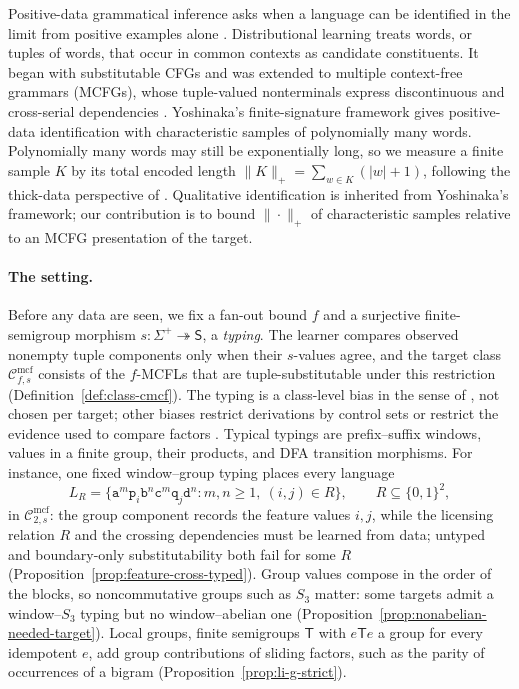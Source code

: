 \documentclass[11pt]{article}
\numberwithin{equation}{section}
\theoremstyle{plain}
\theoremstyle{definition}
\theoremstyle{remark}
\newcommand{\Cmcf}[2]{\mathcal{C}^{\mathrm{mcf}}_{#1,#2}}
\begin{document}
Positive-data grammatical inference asks when a language can be identified
in the limit from positive examples alone \cite{Gold1967,Angluin1980}.
Distributional learning treats words, or tuples of words, that occur in
common contexts as candidate constituents.  It began with substitutable
CFGs \cite{ClarkEyraud2007,Yoshinaka2008} and was extended to multiple
context-free grammars (MCFGs), whose tuple-valued nonterminals express
discontinuous and cross-serial dependencies
\cite{SekiEtAl1991,Yoshinaka2009,Yoshinaka2011,Kallmeyer2010}.
Yoshinaka's finite-signature framework \cite{Yoshinaka2015General} gives
positive-data identification with characteristic samples of polynomially
many words.  Polynomially many words may still be exponentially long, so we
measure a finite sample $K$ by its total encoded length
$\|K\|_+=\sum_{w\in K}(|w|+1)$, following the thick-data perspective of
\cite[Section~2.5.2]{EyraudHeinzYoshinaka2016}.  Qualitative identification
is inherited from Yoshinaka's framework; our contribution is to bound
$\|\cdot\|_+$ of characteristic samples relative to an MCFG presentation of
the target.

\paragraph{The setting.}
Before any data are seen, we fix a fan-out bound $f$ and a surjective
finite-semigroup morphism $s:\Sigma^+\twoheadrightarrow\mathsf S$, a
\emph{typing}.  The learner compares observed nonempty tuple components
only when their $s$-values agree, and the target class $\Cmcf{f}{s}$
consists of the $f$-MCFLs that are tuple-substitutable under this
restriction (Definition~\ref{def:class-cmcf}).  The typing is a
class-level bias in the sense of \cite{CosteTyping2004}, not chosen per
target; other biases restrict derivations by control sets
\cite{Takada1988,Takada1995} or restrict the evidence used to compare
factors \cite{CosteGaretNicolas2012,CosteNicolas2019}.  Typical typings are
prefix--suffix windows, values in a finite group, their products, and DFA
transition morphisms.  For instance, one fixed window--group typing places
every language
\[
 L_R=\{\mathtt a^m\mathtt p_i\mathtt b^n
       \mathtt c^m\mathtt q_j\mathtt d^n:
       m,n\ge1,\ (i,j)\in R\},\qquad R\subseteq\{0,1\}^2,
\]
in $\Cmcf{2}{s}$: the group component records the feature values $i,j$,
while the licensing relation $R$ and the crossing dependencies must be
learned from data; untyped and boundary-only substitutability both fail for
some $R$ (Proposition~\ref{prop:feature-cross-typed}).  Group values compose in the
order of the blocks, so noncommutative groups such as $S_3$ matter: some
targets admit a window--$S_3$ typing but no window--abelian one
(Proposition~\ref{prop:nonabelian-needed-target}).  Local groups, finite
semigroups $\mathsf T$ with $e\mathsf Te$ a group for every idempotent $e$, add group
contributions of sliding factors, such as the parity of occurrences of a
bigram (Proposition~\ref{prop:li-g-strict}).
\end{document}
